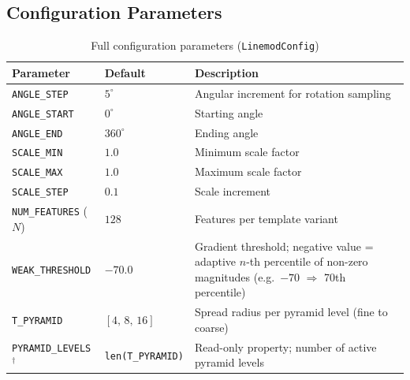 \documentclass[12pt,a4paper]{article}
\begin{document}
\subsection{Configuration Parameters}

\begin{table}[H]
  \centering
  \caption{Full configuration parameters (\texttt{LinemodConfig})}
  \label{tab:params}
  \begin{tabular}{p{5.2cm}p{3.2cm}p{5.5cm}}
    \toprule
    \textbf{Parameter}                    & \textbf{Default}            & \textbf{Description}                                                \\
    \midrule
    \texttt{ANGLE\_STEP}                  & $5^\circ$                   & Angular increment for rotation sampling                             \\
    \texttt{ANGLE\_START}                 & $0^\circ$                   & Starting angle                                                      \\
    \texttt{ANGLE\_END}                   & $360^\circ$                 & Ending angle                                                        \\
    \texttt{SCALE\_MIN}                   & $1.0$                       & Minimum scale factor                                                \\
    \texttt{SCALE\_MAX}                   & $1.0$                       & Maximum scale factor                                                \\
    \texttt{SCALE\_STEP}                  & $0.1$                       & Scale increment                                                     \\
    \texttt{NUM\_FEATURES} ($N$)          & $128$                       & Features per template variant                                       \\
    \texttt{WEAK\_THRESHOLD}              & $-70.0$                     & Gradient threshold; negative value = adaptive $n$-th percentile
                                                                         of non-zero magnitudes (e.g.\ $-70$ $\Rightarrow$ 70th percentile) \\
    \texttt{T\_PYRAMID}                   & $[4,\,8,\,16]$              & Spread radius per pyramid level (fine to coarse)                    \\
    \texttt{PYRAMID\_LEVELS}$^\dagger$    & \texttt{len(T\_PYRAMID)}    & Read-only property; number of active pyramid levels                 \\

\end{tabular}
\end{table}
\end{document}
